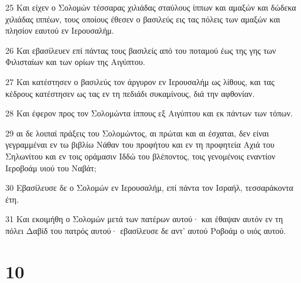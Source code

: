 \par 25 Και είχεν ο Σολομών τέσσαρας χιλιάδας σταύλους ίππων και αμαξών και δώδεκα χιλιάδας ιππέων, τους οποίους έθεσεν ο βασιλεύς εις τας πόλεις των αμαξών και πλησίον εαυτού εν Ιερουσαλήμ.
\par 26 Και εβασίλευεν επί πάντας τους βασιλείς από του ποταμού έως της γης των Φιλισταίων και των ορίων της Αιγύπτου.
\par 27 Και κατέστησεν ο βασιλεύς τον άργυρον εν Ιερουσαλήμ ως λίθους, και τας κέδρους κατέστησεν ως τας εν τη πεδιάδι συκαμίνους, διά την αφθονίαν.
\par 28 Και έφερον προς τον Σολομώντα ίππους εξ Αιγύπτου και εκ πάντων των τόπων.
\par 29 αι δε λοιπαί πράξεις του Σολομώντος, αι πρώται και αι έσχαται, δεν είναι γεγραμμέναι εν τω βιβλίω Νάθαν του προφήτου και εν τη προφητεία Αχιά του Σηλωνίτου και εν τοις οράμασιν Ιδδώ του βλέποντος, τοις γενομένοις εναντίον Ιεροβοάμ υιού του Ναβάτ;
\par 30 Εβασίλευσε δε ο Σολομών εν Ιερουσαλήμ, επί πάντα τον Ισραήλ, τεσσαράκοντα έτη.
\par 31 Και εκοιμήθη ο Σολομών μετά των πατέρων αυτού· και έθαψαν αυτόν εν τη πόλει Δαβίδ του πατρός αυτού· εβασίλευσε δε αντ' αυτού Ροβοάμ ο υιός αυτού.

\chapter{10}


